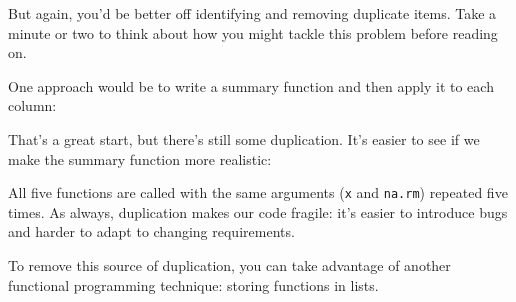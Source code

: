 But again, you'd be better off identifying and removing duplicate items.
Take a minute or two to think about how you might tackle this problem
before reading on.

One approach would be to write a summary function and then apply it to
each column:

\begin{Shaded}
\begin{Highlighting}[]
\StringTok{ }
  \NormalTok{(}
\NormalTok{\}}
\end{Highlighting}
\end{Shaded}

That's a great start, but there's still some duplication. It's easier to
see if we make the summary function more realistic:

\begin{Shaded}
\begin{Highlighting}[]
\StringTok{ }
 \NormalTok{(} \NormalTok{),}
    \NormalTok{),}
    \NormalTok{),}
    \NormalTok{),}
    \NormalTok{))}
\NormalTok{\}}
\end{Highlighting}
\end{Shaded}

All five functions are called with the same arguments (\texttt{x} and
\texttt{na.rm}) repeated five times. As always, duplication makes our
code fragile: it's easier to introduce bugs and harder to adapt to
changing requirements.

To remove this source of duplication, you can take advantage of another
functional programming technique: storing functions in lists.

\begin{Shaded}
\begin{Highlighting}[]
\StringTok{ }
\StringTok{ }
   \NormalTok{))}
\NormalTok{\}}
\end{Highlighting}
\end{Shaded}

